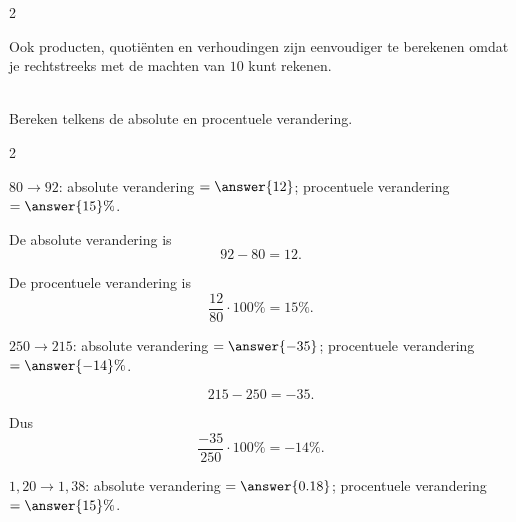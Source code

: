 \documentclass{ximera}
\begin{document}
\begin{oefening}{\oefU}
\begin{multicols}{2}
\begin{question}
\begin{oplossing}
                Ook producten, quotiënten en verhoudingen zijn eenvoudiger te berekenen
                omdat je rechtstreeks met de machten van $10$ kunt rekenen.
                \end{oplossing}
                \end{question}
                
                \end{multicols}
                
                \end{oefening}




\begin{oefening}{\oefB\ESS}
    \\
    
    Bereken telkens de absolute en procentuele verandering.
    
    \begin{multicols}{2}
    
    \begin{question}
    $80\to92$: absolute verandering $=\answer{12}$; procentuele verandering $=\answer{15}\%$.
    
    \begin{oplossing}
    De absolute verandering is
    \[
    92-80=12.
    \]
    
    De procentuele verandering is
    \[
    \dfrac{12}{80}\cdot100\%=15\%.
    \]
    \end{oplossing}
    \end{question}
    
    
    \begin{question}
    $250\to215$: absolute verandering $=\answer{-35}$; procentuele verandering $=\answer{-14}\%$.
    
    \begin{oplossing}
    \[
    215-250=-35.
    \]
    
    Dus
    \[
    \dfrac{-35}{250}\cdot100\%=-14\%.
    \]
    \end{oplossing}
    \end{question}
    
    
    \begin{question}
    $1{,}20\to1{,}38$: absolute verandering $=\answer{0.18}$; procentuele verandering $=\answer{15}\%$.
    

\end{question}
\end{multicols}
\end{oefening}
\end{document}
